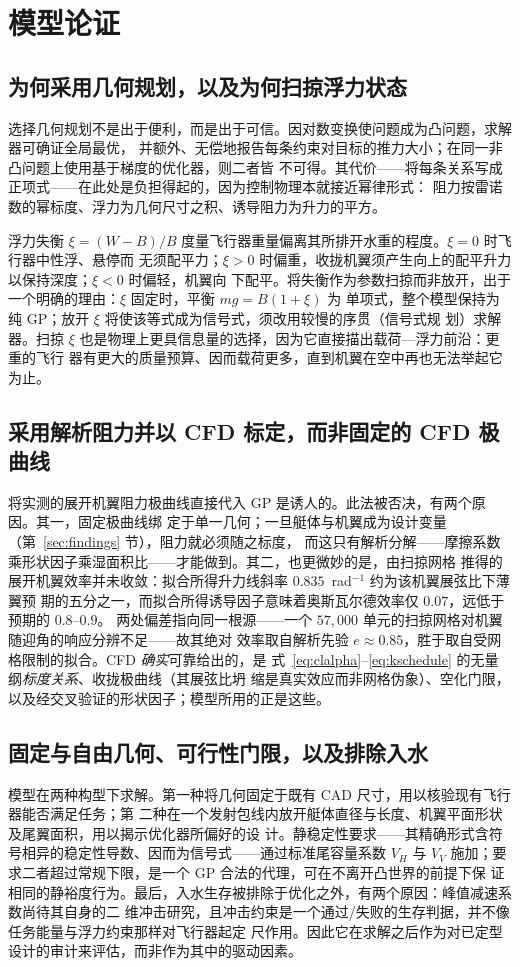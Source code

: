 \documentclass[a4paper,10pt,twocolumn]{ctexart}
\begin{document}
\section{模型论证}\label{sec:justify}

\subsection{为何采用几何规划，以及为何扫掠浮力状态}
选择几何规划不是出于便利，而是出于可信。因对数变换使问题成为凸问题，求解器可确证全局最优，
并额外、无偿地报告每条约束对目标的推力大小；在同一非凸问题上使用基于梯度的优化器，则二者皆
不可得。其代价——将每条关系写成正项式——在此处是负担得起的，因为控制物理本就接近幂律形式：
阻力按雷诺数的幂标度、浮力为几何尺寸之积、诱导阻力为升力的平方。

浮力失衡 $\xi=(W-B)/B$ 度量飞行器重量偏离其所排开水重的程度。$\xi=0$ 时飞行器中性浮、悬停而
无须配平力；$\xi>0$ 时偏重，收拢机翼须产生向上的配平升力以保持深度；$\xi<0$ 时偏轻，机翼向
下配平。将失衡作为参数扫掠而非放开，出于一个明确的理由：$\xi$ 固定时，平衡 $mg=B(1+\xi)$ 为
单项式，整个模型保持为纯 GP；放开 $\xi$ 将使该等式成为信号式，须改用较慢的序贯（信号式规
划）求解器。扫掠 $\xi$ 也是物理上更具信息量的选择，因为它直接描出载荷—浮力前沿：更重的飞行
器有更大的质量预算、因而载荷更多，直到机翼在空中再也无法举起它为止。

\subsection{采用解析阻力并以 CFD 标定，而非固定的 CFD 极曲线}
将实测的展开机翼阻力极曲线直接代入 GP 是诱人的。此法被否决，有两个原因。其一，固定极曲线绑
定于单一几何；一旦艇体与机翼成为设计变量（第~\ref{sec:findings} 节），阻力就必须随之标度，
而这只有解析分解——摩擦系数乘形状因子乘湿面积比——才能做到。其二，也更微妙的是，由扫掠网格
推得的展开机翼效率并未收敛：拟合所得升力线斜率 $0.835$~rad$^{-1}$ 约为该机翼展弦比下薄翼预
期的五分之一，而拟合所得诱导因子意味着奥斯瓦尔德效率仅 $0.07$，远低于预期的 $0.8$--$0.9$。
两处偏差指向同一根源——一个 $57{,}000$ 单元的扫掠网格对机翼随迎角的响应分辨不足——故其绝对
效率取自解析先验 $e\approx0.85$，胜于取自受网格限制的拟合。CFD \emph{确实}可靠给出的，是
式~\eqref{eq:clalpha}--\eqref{eq:kschedule} 的无量纲\emph{标度关系}、收拢极曲线（其展弦比坍
缩是真实效应而非网格伪象）、空化门限，以及经交叉验证的形状因子；模型所用的正是这些。

\subsection{固定与自由几何、可行性门限，以及排除入水}
模型在两种构型下求解。第一种将几何固定于既有 CAD 尺寸，用以核验现有飞行器能否满足任务；第
二种在一个发射包线内放开艇体直径与长度、机翼平面形状及尾翼面积，用以揭示优化器所偏好的设
计。静稳定性要求——其精确形式含符号相异的稳定性导数、因而为信号式——通过标准尾容量系数
$V_H$ 与 $V_V$ 施加；要求二者超过常规下限，是一个 GP 合法的代理，可在不离开凸世界的前提下保
证相同的静裕度行为。最后，入水生存被排除于优化之外，有两个原因：峰值减速系数尚待其自身的二
维冲击研究，且冲击约束是一个通过/失败的生存判据，并不像任务能量与浮力约束那样对飞行器起定
尺作用。因此它在求解之后作为对已定型设计的审计来评估，而非作为其中的驱动因素。
\end{document}
